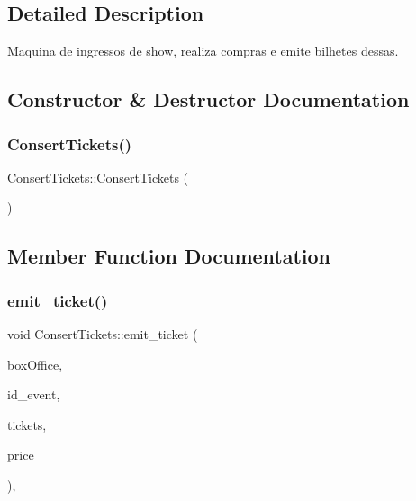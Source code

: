 \subsection{Detailed Description}
Maquina de ingressos de show, realiza compras e emite bilhetes dessas. 

\subsection{Constructor \& Destructor Documentation}
\mbox{\label{class_consert_tickets_ab5d6797982b8c17b329d54b6f0dfb615}} 
\subsubsection{\texorpdfstring{Consert\+Tickets()}{ConsertTickets()}}
{\footnotesize\ttfamily Consert\+Tickets\+::\+Consert\+Tickets (\begin{DoxyParamCaption}{ }\end{DoxyParamCaption})}



\subsection{Member Function Documentation}
\mbox{\label{class_consert_tickets_af1c027f9ef23dc346c6c51f9d2b5ac68}} 
\subsubsection{\texorpdfstring{emit\+\_\+ticket()}{emit\_ticket()}}
{\footnotesize\ttfamily void Consert\+Tickets\+::emit\+\_\+ticket (\begin{DoxyParamCaption}\item[{\hyperlink{class_box_office}{Box\+Office} $\ast$}]{box\+Office,  }\item[{int}]{id\+\_\+event,  }\item[{int}]{tickets,  }\item[{int}]{price }\end{DoxyParamCaption})\hspace{0.3cm}{\ttfamily [override]}, {\ttfamily [virtual]}}



